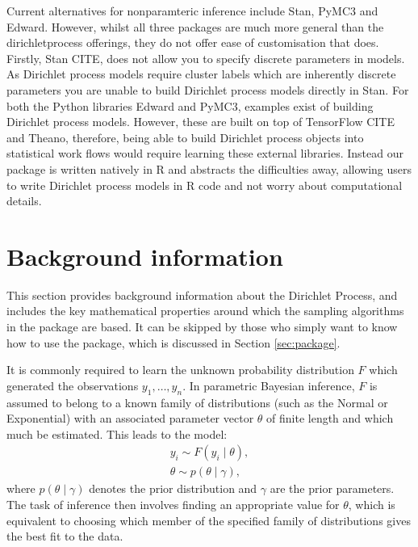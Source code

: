 \documentclass[nojss]{jss}
\begin{document}
Current alternatives for nonparamteric inference include Stan, PyMC3 and Edward. However, whilst all three packages are much more general than the dirichletprocess offerings, they do not offer ease of customisation that  does. Firstly, Stan CITE, does not allow you to specify discrete parameters in models. As Dirichlet process models require cluster labels which are inherently discrete parameters you are unable to build Dirichlet process models directly in Stan. For both the Python libraries Edward and PyMC3, examples exist of building Dirichlet process models. However, these are built on top of TensorFlow CITE and Theano, therefore, being able to build Dirichlet process objects into statistical work flows would require learning these external libraries. Instead our package  is written natively in R and abstracts the difficulties away, allowing users to write Dirichlet process models in R code and not worry about computational details.

\section{Background information}
\label{sec:background}

This section provides background information about the Dirichlet Process, and includes the key mathematical properties around which the sampling algorithms in the  package are based. It can be skipped by those who simply want to know how to use the package, which is discussed in Section  \ref{sec:package}.


It is commonly required to learn the unknown probability distribution $F$ which generated the observations $y_1,\ldots,y_n$. In parametric Bayesian inference, $F$ is assumed to belong to a known family of distributions (such as the Normal or Exponential) with an associated parameter vector $\theta$ of finite length and which much be estimated. This leads to the model:
\begin{align*}
y_i \sim F(y_i \mid \theta), \\
\theta \sim p(\theta \mid \gamma),
\end{align*}
where $p(\theta \mid \gamma)$ denotes the prior distribution and $\gamma$ are the prior parameters. The task of inference then involves finding an appropriate value for $\theta$, which is equivalent to choosing which member of the specified family of distributions gives the best fit to the data.
\end{document}
